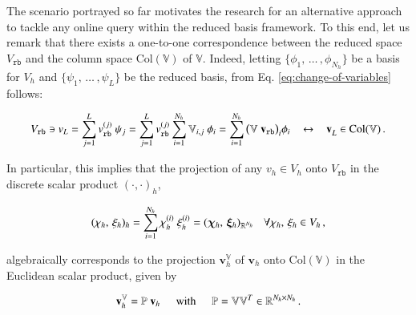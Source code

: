 \documentclass[longtitle]{elsarticle}
\numberwithin{equation}{section}
\theoremstyle{theorem}
\theoremstyle{definition}
\theoremstyle{remark}
\theoremstyle{proposition}
\numberwithin{figure}{section}
\newcommand{\bg}[1]{\boldsymbol{#1}}
\begin{document}
		The scenario portrayed so far motivates the research for an alternative approach to tackle any online query within the reduced basis framework. To this end, let us remark that there exists a one-to-one correspondence between the reduced space $V_{\texttt{rb}}$ and the column space $\text{Col}(\mathbb{V})$ of $\mathbb{V}$. Indeed, letting $\big\lbrace \phi_1, \, \ldots \, , \phi_{N_h} \big\rbrace$ be a basis for $V_h$ and $\big\lbrace \psi_1, \, \ldots \, , \psi_L \big\rbrace$ be the reduced basis, from Eq. \eqref{eq:change-of-variables} follows:
		\begin{linenomath}\begin{equation*}
			V_{\texttt{rb}} \ni v_{L} = \sum_{j = 1}^L v_{\texttt{rb}}^{(j)} ~ \psi_j = \sum_{j = 1}^L v_{\texttt{rb}}^{(j)} \sum_{i = 1}^{N_h} \mathbb{V}_{i,j} ~ \phi_i = \sum_{i = 1}^{N_h} \big( \mathbb{V} ~ \mathbf{v}_{\texttt{rb}} \big)_i \phi_i \hspace*{0.3cm} \leftrightarrow \hspace*{0.3cm} \mathbf{v}_L^{} \in \text{Col}(\mathbb{V}) \, .
		\end{equation*}\end{linenomath} 
		In particular, this implies that the projection of any $v_h \in V_h$ onto $V_{\texttt{rb}}$ in the discrete scalar product $(\cdot,\cdot)_h$, 
		\begin{linenomath}\begin{linenomath}\begin{equation}
			\label{eq:discrete-scalar-product}
			(\chi_h, \, \xi_h)_h = \sum_{i = 1}^{N_h} \chi_h^{(i)} ~ \xi_h^{(i)} = (\bg{\chi}_h, \, \bg{\xi}_h)_{\mathbb{R}^{N_h}} \hspace*{0.3cm} \text{$\forall \chi_h, \, \xi_h \in V_h$} \, , 
		\end{equation}\end{linenomath}\end{linenomath}
		algebraically corresponds to the projection $\mathbf{v}_h^{\mathbb{V}}$ of $\mathbf{v}_h$ onto $\text{Col}(\mathbb{V})$ in the Euclidean scalar product, given by
		\begin{linenomath}\begin{equation*}
			\mathbf{v}_h^{\mathbb{V}} = \mathbb{P} ~ \mathbf{v}_h \hspace*{0.5cm} \text{with} \hspace*{0.5cm} \mathbb{P} = \mathbb{V} \mathbb{V}^T \in \mathbb{R}^{{N_h} \times {N_h}} \, .
		\end{equation*}\end{linenomath}
\end{document}
